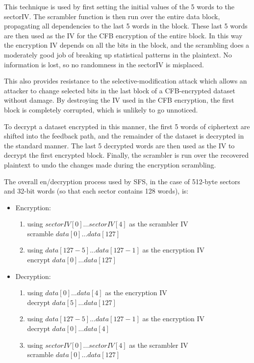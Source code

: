 This technique is used by first setting the initial values of the 5 words to
the sectorIV.  The scrambler function is then run over the entire data block,
propagating all dependencies to the last 5 words in the block.  These last 5
words are then used as the IV for the CFB encryption of the entire block.  In
this way the encryption IV depends on all the bits in the block, and the
scrambling does a moderately good job of breaking up statistical patterns in
the plaintext.  No information is lost, so no randomness in the sectorIV is
misplaced.

This also provides resistance to the selective-modification attack which allows
an attacker to change selected bits in the last block of a CFB-encrypted
dataset without damage.  By destroying the IV used in the CFB encryption, the
first block is completely corrupted, which is unlikely to go unnoticed.

To decrypt a dataset encrypted in this manner, the first 5 words of ciphertext
are shifted into the feedback path, and the remainder of the dataset is
decrypted in the standard manner.  The last 5 decrypted words are then used as
the IV to decrypt the first encrypted block.  Finally, the scrambler is run
over the recovered plaintext to undo the changes made during the encryption
scrambling.

The overall en/decryption process used by SFS, in the case of 512-byte sectors
and 32-bit words (so that each sector contains 128 words), is:

\begin{itemize}
\item Encryption:
\begin{enumerate}
  \item using $sectorIV[ 0 ]...sectorIV[ 4 ]$ as the scrambler IV\\
            scramble $data[ 0 ]...data[ 127 ]$

  \item using $data[ 127-5 ]...data[ 127-1 ]$ as the encryption IV\\
            encrypt $data[ 0 ]...data[ 127 ]$
\end{enumerate}
\item Decryption:
\begin{enumerate}
  \item using $data[ 0 ]...data[ 4 ]$ as the encryption IV\\
            decrypt $data[ 5 ]...data[ 127 ]$

  \item using $data[ 127-5 ]...data[ 127-1 ]$ as the encryption IV\\
            decrypt $data[ 0 ]...data[ 4 ]$

  \item using $sectorIV[ 0 ]...sectorIV[ 4 ]$ as the scrambler IV\\
            scramble $data[ 0 ]...data[ 127 ]$
\end{enumerate}
\end{itemize}

